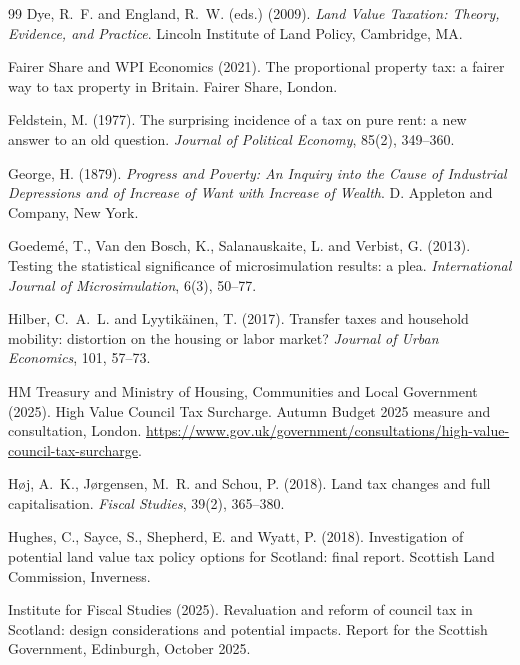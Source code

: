 \begin{thebibliography}{99}
Dye, R.~F. and England, R.~W. (eds.) (2009).
\newblock \emph{Land Value Taxation: Theory, Evidence, and Practice}.
\newblock Lincoln Institute of Land Policy, Cambridge, MA.

Fairer Share and WPI Economics (2021).
\newblock The proportional property tax: a fairer way to tax property in Britain.
\newblock Fairer Share, London.

Feldstein, M. (1977).
\newblock The surprising incidence of a tax on pure rent: a new answer to an old question.
\newblock \emph{Journal of Political Economy}, 85(2), 349--360.

George, H. (1879).
\newblock \emph{Progress and Poverty: An Inquiry into the Cause of Industrial Depressions and of Increase of Want with Increase of Wealth}.
\newblock D. Appleton and Company, New York.

Goedem\'e, T., Van den Bosch, K., Salanauskaite, L. and Verbist, G. (2013).
\newblock Testing the statistical significance of microsimulation results: a plea.
\newblock \emph{International Journal of Microsimulation}, 6(3), 50--77.

Hilber, C.~A.~L. and Lyytik\"ainen, T. (2017).
\newblock Transfer taxes and household mobility: distortion on the housing or labor market?
\newblock \emph{Journal of Urban Economics}, 101, 57--73.

HM Treasury and Ministry of Housing, Communities and Local Government (2025).
\newblock High Value Council Tax Surcharge.
\newblock Autumn Budget 2025 measure and consultation, London.
\newblock \url{https://www.gov.uk/government/consultations/high-value-council-tax-surcharge}.

H\o j, A.~K., J\o rgensen, M.~R. and Schou, P. (2018).
\newblock Land tax changes and full capitalisation.
\newblock \emph{Fiscal Studies}, 39(2), 365--380.

Hughes, C., Sayce, S., Shepherd, E. and Wyatt, P. (2018).
\newblock Investigation of potential land value tax policy options for Scotland: final report.
\newblock Scottish Land Commission, Inverness.

Institute for Fiscal Studies (2025).
\newblock Revaluation and reform of council tax in Scotland: design considerations and potential impacts.
\newblock Report for the Scottish Government, Edinburgh, October 2025.


\end{thebibliography}
